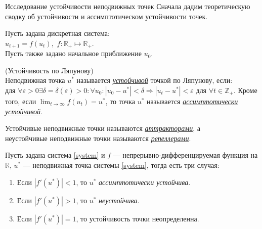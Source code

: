 \documentclass[11pt]{article}
\begin{document}
	\begin{subsection}{Исследование устойчивости неподвижных точек}
	Сначала дадим теоретическую сводку об устойчивости и ассимптотическом устойчивости точек.
	\begin{Commentocre}
	Пусть задана дискретная система: \\
	$u_{t+1} = f(u_t),$ $ f: \mathbb{R}_+ \mapsto \mathbb{R}_+ $.\label{system}\\
	Пусть также задано начальное приближение $u_0$.
	\end{Commentocre}
	\begin{definition}(Устойчивость по Ляпунову) \\
	Неподвижная точка $u^*$ называется \underline{\it устойчивой} точкой по Ляпунову, если: \\
	 для 
	$\forall \varepsilon > 0 \exists \delta=\delta(\varepsilon) > 0 : \forall u_0:
	|u_0 - u^*| < \delta \Rightarrow |u_t - u^*| < \varepsilon $ для $\forall t \in \mathbb{Z}_+ $. Кроме того, если $\lim_{t\to\infty}{f(u_t)} = u^*$, то точка $u^*$ называется \underline{\it ассимптотически устойчивой}.	
	\end{definition}
	\begin{definition}
	Устойчивые неподвижные точки называются \underline{\it аттракторами}, а \\ неустойчивые неподвижные точки называются \underline{\it репеллерами}.
	\end{definition}
	\begin{proposition}Пусть задана система \ref{system} и $f$ --- непрерывно-дифференцируемая функция на $\mathbb{R}$, $u^*$ --- неподвижная точка системы \ref{system}, тогда есть три случая:
	\begin{enumerate}
	\item Если $|f'(u^*)| < 1$, то $u^*$ {\it ассимптотически устойчива}.
	\item Если $|f'(u^*)| > 1$, то $u^*$ {\it неустойчива}.
	\item Если $|f'(u^*)| = 1$, то устойчивость точки неопределенна.
	\end{enumerate}
	\end{proposition}
	

\end{subsection}
\end{document}
